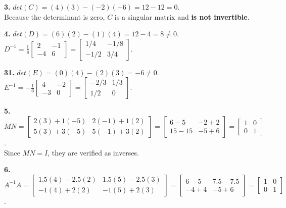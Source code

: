 \documentclass{article}
\begin{document}
\vspace{5pt}
\noindent
\textbf{3.} $det(C) = (4)(3) - (-2)(-6) = 12 - 12 = 0$. \\
Because the determinant is zero, $C$ is a singular matrix and \textbf{is not invertible}.

\vspace{5pt}
\noindent
\textbf{4.} $det(D) = (6)(2) - (1)(4) = 12 - 4 = 8 \neq 0$. \\
$D^{-1} = \frac{1}{8} \begin{bmatrix} 2 & -1 \\ -4 & 6 \end{bmatrix} = \begin{bmatrix} 1/4 & -1/8 \\ -1/2 & 3/4 \end{bmatrix}$.

\vspace{5pt}
\noindent
\textbf{31.} $det(E) = (0)(4) - (2)(3) = -6 \neq 0$. \\
$E^{-1} = -\frac{1}{6} \begin{bmatrix} 4 & -2 \\ -3 & 0 \end{bmatrix} = \begin{bmatrix} -2/3 & 1/3 \\ 1/2 & 0 \end{bmatrix}$.

\vspace{5pt}
\noindent
\textbf{5.} $MN = \begin{bmatrix} 2(3)+1(-5) & 2(-1)+1(2) \\ 5(3)+3(-5) & 5(-1)+3(2) \end{bmatrix} = \begin{bmatrix} 6-5 & -2+2 \\ 15-15 & -5+6 \end{bmatrix} = \begin{bmatrix} 1 & 0 \\ 0 & 1 \end{bmatrix}$. \\
Since $MN = I$, they are verified as inverses.

\vspace{5pt}
\noindent
\textbf{6.} $A^{-1}A = \begin{bmatrix} 1.5(4) - 2.5(2) & 1.5(5) - 2.5(3) \\ -1(4) + 2(2) & -1(5) + 2(3) \end{bmatrix} = \begin{bmatrix} 6-5 & 7.5-7.5 \\ -4+4 & -5+6 \end{bmatrix} = \begin{bmatrix} 1 & 0 \\ 0 & 1 \end{bmatrix}$.
\end{document}
